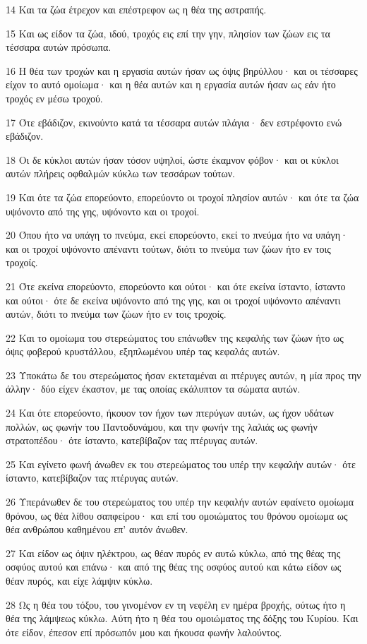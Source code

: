 \par 14 Και τα ζώα έτρεχον και επέστρεφον ως η θέα της αστραπής.
\par 15 Και ως είδον τα ζώα, ιδού, τροχός εις επί την γην, πλησίον των ζώων εις τα τέσσαρα αυτών πρόσωπα.
\par 16 Η θέα των τροχών και η εργασία αυτών ήσαν ως όψις βηρύλλου· και οι τέσσαρες είχον το αυτό ομοίωμα· και η θέα αυτών και η εργασία αυτών ήσαν ως εάν ήτο τροχός εν μέσω τροχού.
\par 17 Ότε εβάδιζον, εκινούντο κατά τα τέσσαρα αυτών πλάγια· δεν εστρέφοντο ενώ εβάδιζον.
\par 18 Οι δε κύκλοι αυτών ήσαν τόσον υψηλοί, ώστε έκαμνον φόβον· και οι κύκλοι αυτών πλήρεις οφθαλμών κύκλω των τεσσάρων τούτων.
\par 19 Και ότε τα ζώα επορεύοντο, επορεύοντο οι τροχοί πλησίον αυτών· και ότε τα ζώα υψόνοντο από της γης, υψόνοντο και οι τροχοί.
\par 20 Όπου ήτο να υπάγη το πνεύμα, εκεί επορεύοντο, εκεί το πνεύμα ήτο να υπάγη· και οι τροχοί υψόνοντο απέναντι τούτων, διότι το πνεύμα των ζώων ήτο εν τοις τροχοίς.
\par 21 Ότε εκείνα επορεύοντο, επορεύοντο και ούτοι· και ότε εκείνα ίσταντο, ίσταντο και ούτοι· ότε δε εκείνα υψόνοντο από της γης, και οι τροχοί υψόνοντο απέναντι αυτών, διότι το πνεύμα των ζώων ήτο εν τοις τροχοίς.
\par 22 Και το ομοίωμα του στερεώματος του επάνωθεν της κεφαλής των ζώων ήτο ως όψις φοβερού κρυστάλλου, εξηπλωμένου υπέρ τας κεφαλάς αυτών.
\par 23 Υποκάτω δε του στερεώματος ήσαν εκτεταμέναι αι πτέρυγες αυτών, η μία προς την άλλην· δύο είχεν έκαστον, με τας οποίας εκάλυπτον τα σώματα αυτών.
\par 24 Και ότε επορεύοντο, ήκουον τον ήχον των πτερύγων αυτών, ως ήχον υδάτων πολλών, ως φωνήν του Παντοδυνάμου, και την φωνήν της λαλιάς ως φωνήν στρατοπέδου· ότε ίσταντο, κατεβίβαζον τας πτέρυγας αυτών.
\par 25 Και εγίνετο φωνή άνωθεν εκ του στερεώματος του υπέρ την κεφαλήν αυτών· ότε ίσταντο, κατεβίβαζον τας πτέρυγας αυτών.
\par 26 Υπεράνωθεν δε του στερεώματος του υπέρ την κεφαλήν αυτών εφαίνετο ομοίωμα θρόνου, ως θέα λίθου σαπφείρου· και επί του ομοιώματος του θρόνου ομοίωμα ως θέα ανθρώπου καθημένου επ' αυτόν άνωθεν.
\par 27 Και είδον ως όψιν ηλέκτρου, ως θέαν πυρός εν αυτώ κύκλω, από της θέας της οσφύος αυτού και επάνω· και από της θέας της οσφύος αυτού και κάτω είδον ως θέαν πυρός, και είχε λάμψιν κύκλω.
\par 28 Ως η θέα του τόξου, του γινομένον εν τη νεφέλη εν ημέρα βροχής, ούτως ήτο η θέα της λάμψεως κύκλω. Αύτη ήτο η θέα του ομοιώματος της δόξης του Κυρίου. Και ότε είδον, έπεσον επί πρόσωπόν μου και ήκουσα φωνήν λαλούντος.

